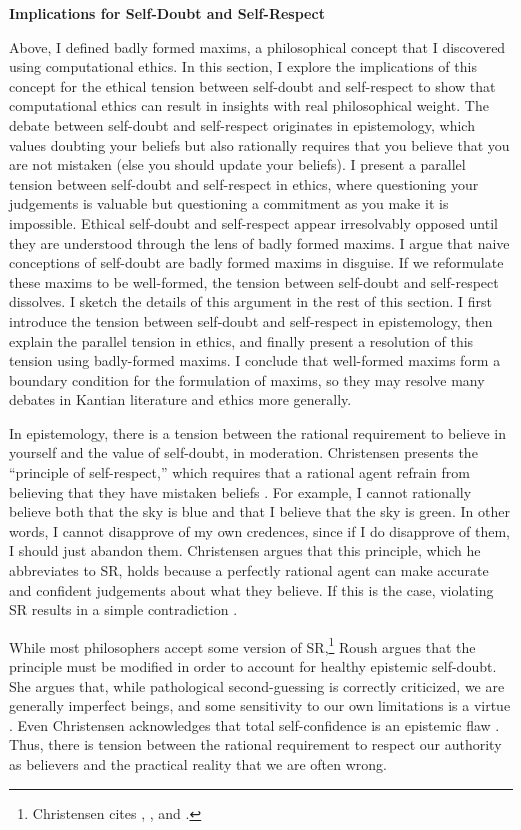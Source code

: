 \begin{isabellebody}
\begin{isamarkuptext}
\noindent \textbf{Implications for Self-Doubt and Self-Respect}

Above, I defined badly formed maxims, a philosophical concept that I discovered
using computational ethics. In this section, I explore the implications of this concept for the ethical
tension between self-doubt and self-respect to show that computational ethics can result in insights with real 
philosophical weight. The debate between self-doubt and self-respect originates in epistemology, which 
values doubting your beliefs but also rationally requires that you believe that you are not mistaken 
(else you should update your beliefs). I present a parallel tension between self-doubt and self-respect
in ethics, where questioning your judgements is valuable but 
questioning a commitment as you make it is impossible. Ethical self-doubt and self-respect appear 
irresolvably opposed until they are understood through the lens of badly formed maxims. I argue that naive
conceptions of self-doubt are badly formed maxims in disguise. If we reformulate these maxims to be well-formed,
the tension between self-doubt and self-respect dissolves. I sketch the details of this argument in 
the rest of this section. I first introduce the tension between self-doubt and self-respect 
in epistemology, then explain the parallel tension in ethics, and finally present a resolution of this 
tension using badly-formed maxims. I conclude that well-formed maxims form a boundary condition for
the formulation of maxims, so they may resolve many debates in Kantian literature and ethics more generally.

In epistemology, there is a tension between the rational requirement to believe in yourself and the 
value of self-doubt, in moderation. Christensen presents the ``principle of self-respect,'' which requires 
that a rational agent refrain from believing that they have mistaken beliefs \cite[4]{christensen}. For example, I cannot 
rationally believe both that the sky is blue and that I believe that the sky is green. In other words, I cannot 
disapprove of my own credences, since if I do disapprove of them, I should just abandon them. Christensen 
argues that this principle, which he abbreviates to SR, holds because 
a perfectly rational agent can make accurate and confident judgements about what they believe. If this 
is the case, violating SR results in a simple contradiction \cite[8-9]{christensen}. 

While most philosophers accept some version of SR,\footnote{Christensen cites \citet{vanfraassen}, 
\citet{vickers}, and \citet{koons}.}
Roush argues that the principle must be modified in order to account for healthy epistemic 
self-doubt. She argues that, while pathological second-guessing is correctly criticized, we are generally 
imperfect beings, and some sensitivity to our own limitations is a virtue \cite[2]{roushselfhelp}. Even Christensen 
acknowledges that total self-confidence is an epistemic flaw \cite[1]{christensen}. Thus, there is tension between the rational
requirement to respect our authority as believers and the practical reality that we are often wrong. 


\end{isamarkuptext}
\end{isabellebody}
